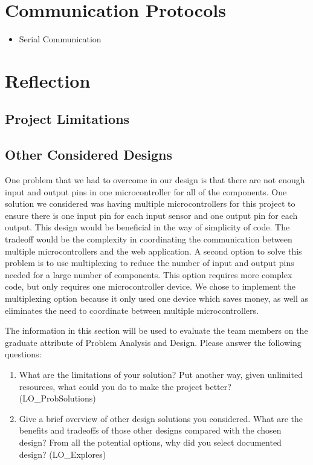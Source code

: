 \documentclass[12pt, titlepage]{article}
\begin{document}
\section{Communication Protocols}
\begin{itemize}
  \item Serial Communication
\end{itemize}

\section{Reflection}

\subsection*{Project Limitations}

\subsection*{Other Considered Designs}
One problem that we had to overcome in our design is that there are not enough input and output pins in one microcontroller for all of the components.
One solution we considered was having multiple microcontrollers for this project to ensure there is one input pin for each input sensor and one output pin for each output.
This design would be beneficial in the way of simplicity of code. The tradeoff would be the complexity in coordinating the communication between multiple microcontrollers and the 
web application. A second option to solve this problem is to use multiplexing to reduce the number of input and output pins needed for a large number of components. 
This option requires more complex code, but only requires one microcontroller device. We chose to implement the multiplexing option because it only used one device which saves money,
as well as eliminates the need to coordinate between multiple microcontrollers. 

The information in this section will be used to evaluate the team members on the
graduate attribute of Problem Analysis and Design.  Please answer the following questions:

\begin{enumerate}
  \item What are the limitations of your solution?  Put another way, given
  unlimited resources, what could you do to make the project better? (LO\_ProbSolutions)
  \item Give a brief overview of other design solutions you considered.  What
  are the benefits and tradeoffs of those other designs compared with the chosen
  design?  From all the potential options, why did you select documented design?
  (LO\_Explores)
\end{enumerate}
\end{document}
